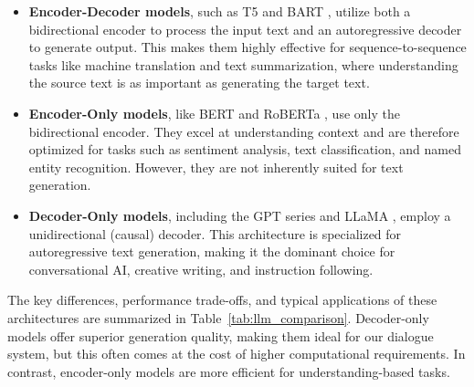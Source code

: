 \documentclass[12pt,a4paper]{article}
\begin{document}
\begin{itemize}
    \item \textbf{Encoder-Decoder models}, such as T5 \cite{raffel2020exploring} and BART \cite{lewis2019bart}, utilize both a bidirectional encoder to process the input text and an autoregressive decoder to generate output. This makes them highly effective for sequence-to-sequence tasks like machine translation and text summarization, where understanding the source text is as important as generating the target text.
    \item \textbf{Encoder-Only models}, like BERT \cite{devlin2018bert} and RoBERTa \cite{liu2019roberta}, use only the bidirectional encoder. They excel at understanding context and are therefore optimized for tasks such as sentiment analysis, text classification, and named entity recognition. However, they are not inherently suited for text generation.
    \item \textbf{Decoder-Only models}, including the GPT series \cite{radford2018improving} and LLaMA \cite{touvron2023llama}, employ a unidirectional (causal) decoder. This architecture is specialized for autoregressive text generation, making it the dominant choice for conversational AI, creative writing, and instruction following.
\end{itemize}

The key differences, performance trade-offs, and typical applications of these architectures are summarized in Table~\ref{tab:llm_comparison}. Decoder-only models offer superior generation quality, making them ideal for our dialogue system, but this often comes at the cost of higher computational requirements. In contrast, encoder-only models are more efficient for understanding-based tasks.
\end{document}
